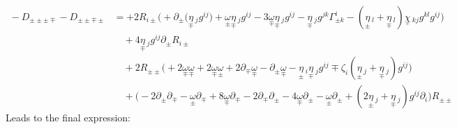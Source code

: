 \documentclass[a4paper,11pt]{article}
\numberwithin{equation}{section}
\theoremstyle{definition}
\begin{document}
\begin{align*}
    \!\!\!\!\!\!\!\!\!\!
    - D_{\pm\pm\pm\mp} -D_{\pm\pm\mp\pm}
    &=
    + 2 R_{i \pm} \Big(
    + \partial_\pm\big(\underset{\mp}{\eta}\,_j g^{ij} \big)
    + \underset{\pm}{\omega} \underset{\mp}{\eta}\,_j g^{ij}
    -3 \underset{\mp}{\omega} \underset{\mp}{\eta}\,_j g^{ij}
    - \underset{\mp}{\eta}\,_j g^{jk} \Gamma_{\pm k}^i
    -  (\underset{\pm}{\eta}\,_l + \underset{\mp}{\eta}\,_l)  \underset{_\mp}{\chi}\,_{kj} g^{kl} g^{ij}  \Big)\\
    &\quad 
    +4 \underset{\mp}{\eta}\,_j g^{ij} \partial_\pm R_{i \pm}\\
    &\quad
    + 2 R_{\pm\pm} \Big(
    + 2 \underset{\mp}{\omega}\underset{\mp}{\omega}
    + 2 \underset{\mp}{\omega} \underset{\pm}{\omega}
    +2 \partial_\mp\underset{\mp}{\omega} 
    - \partial_\pm \underset{\mp}{\omega}
    - \underset{\pm}{\eta}\,_{i} \underset{\mp}{\eta}\,_{ j} g^{ij}  
     \mp  \zeta_i(\underset{\pm}{\eta}\,_{ j}+\underset{\mp}{\eta}\,_j)  g^{ij}\Big)\\
    &\quad 
    +  \Big(
    -2 \partial_\pm\partial_\mp
    -\underset{\pm}{\omega} \partial_\mp
    +8 \underset{\mp}{\omega} \partial_\mp
    -2 \partial_\mp \partial_\pm
    -4 \underset{\mp}{\omega} \partial_\pm
    -\underset{\pm}{\omega} \partial_\pm
    + (2\underset{\pm}{\eta}\,_{ j} + \underset{\mp}{\eta}\,_j) g^{ij}\partial_i
    \Big) R_{\pm\pm}
\end{align*}
Leads to the final expression:
\end{document}

